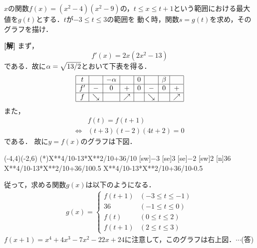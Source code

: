 \documentclass[a4j]{jarticle}
\begin{document}

     \begin{oframed}
     $x$の関数$f(x)=(x^2-4)(x^2-9)$の，$t\le x\le t+1$という範囲における最大値を$g(t)$とする．$t$が$-3\le t\le3$の範囲を
     動く時，関数$s=g(t)$を求め，そのグラフを描け．
     \end{oframed}

\setlength{\columnseprule}{0.4pt}
\begin{multicols}{2}
{\bf[解]} まず，
     \[f'(x)=2x(2x^2-13)\]
である．故に$\alpha=\sqrt{13/2}$とおいて下表を得る．
     \begin{align*}
          \begin{array}{|c|c|c|c|c|c|c|c|} \hline
          t&     &-\alpha              &    &  0&     &\beta        &        \\ \hline
           f'&-   &0               &+   & 0 & -  &  0       &+      \\ \hline
          f&\searrow&                 &\nearrow&    &\searrow&            &\nearrow   \\ \hline
          \end{array}
    \end{align*}
また，
     \begin{align*}
     &f(t)=f(t+1) \\
     \Longleftrightarrow
     &(t+3)(t-2)(4t+2)=0
     \end{align*}     
である．
故に$y=f(x)$のグラフは下図．\\

     \begin{zahyou}[ul=8mm,gentenhaiti={[ne]}](-4,4)(-2,6)
     \def\Fx{X**4/10-13*X**2/10+36/10}
     \def\Gx{X**4/10+4*X**3/10-7*X**2/10-22*X/10+24/10}
     \def\aval{0.5}
     \def\bval{-0.5}
     \YGurafu*(*)\Fx
     [sw]{$-3$}
     [se]{$3$}
     [se]{$-2$}
     [sw]{$2$}
     [n]{$36$}
     \YTen\Fx\aval\A
     \YTen\Fx\bval\B
     \Put\A[syaei=xy,xlabel=\frac{1}{2},ylabel=]{}
     \Put\B[syaei=xy,xlabel=\frac{-1}{2},ylabel=]{}
     \end{zahyou}

従って，求める関数$g(x)$は以下のようになる．
     \begin{align*}
     g(x)=\left\{
          \begin{array}{ll}
          f(t+1)&(-3\le t\le -1) \\
          36    &(-1\le t\le 0) \\
          f(t)    &(0\le t\le 2) \\
          f(t+1)&(2\le t\le 3)
          \end{array}
     \right.
     \end{align*}
$f(x+1)=x^4+4x^3-7x^2-22x+24$に注意して，このグラフは右上図．$\cdots$(答)
     

\end{multicols}
\end{document}

